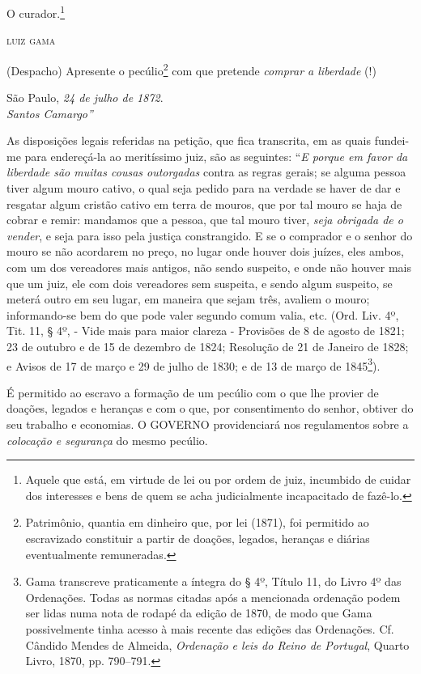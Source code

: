 {O curador.\footnote{ Aquele que está, em virtude de lei ou por ordem de
  juiz, incumbido de cuidar dos interesses e bens de quem se acha
  judicialmente incapacitado de fazê-lo.}

\textsc{luiz gama}

(Despacho) Apresente o pecúlio\footnote{ Patrimônio, quantia em
  dinheiro que, por lei (1871), foi permitido ao escravizado constituir
  a partir de doações, legados, heranças e diárias eventualmente
  remuneradas.} com que pretende \emph{comprar a liberdade} (!)

São Paulo, \emph{24 de julho de 1872}.\\
\emph{Santos Camargo''}

As disposições legais referidas na petição, que fica transcrita, em as
quais fundei-me para endereçá-la ao meritíssimo juiz, são as seguintes:
``\emph{E porque em favor da liberdade são muitas cousas outorgadas}
contra as regras gerais; se alguma pessoa tiver algum mouro cativo, o
qual seja pedido para na verdade se haver de dar e resgatar algum
cristão cativo em terra de mouros, que por tal mouro se haja de cobrar e
remir: mandamos que a pessoa, que tal mouro tiver, \emph{seja obrigada
de o vender}, e seja para isso pela justiça constrangido. E se o
comprador e o senhor do mouro se não acordarem no preço, no lugar onde
houver dois juízes, eles ambos, com um dos vereadores mais antigos, não
sendo suspeito, e onde não houver mais que um juiz, ele com dois
vereadores sem suspeita, e sendo algum suspeito, se meterá outro em seu
lugar, em maneira que sejam três, avaliem o mouro; informando-se bem do
que pode valer segundo comum valia, etc. (Ord. Liv. 4º, Tit. 11, § 4º, -
Vide mais para maior clareza - Provisões de 8 de agosto de 1821; 23 de
outubro e de 15 de dezembro de 1824; Resolução de 21 de Janeiro de 1828;
e Avisos de 17 de março e 29 de julho de 1830; e de 13 de março de
1845\footnote{ Gama transcreve praticamente a íntegra do § 4º, Título
  11, do Livro 4º das Ordenações. Todas as normas citadas após a
  mencionada ordenação podem ser lidas numa nota de rodapé da edição de
  1870, de modo que Gama possivelmente tinha acesso à mais recente das
  edições das Ordenações. Cf. Cândido Mendes de Almeida, \emph{Ordenação
  e leis do Reino de Portugal}, Quarto Livro, 1870, pp. 790--791.}).

É permitido ao escravo a formação de um pecúlio com o que lhe provier de
doações, legados e heranças e com o que, por consentimento do senhor,
obtiver do seu trabalho e economias. O GOVERNO providenciará nos
regulamentos sobre a \emph{colocação e segurança} do mesmo pecúlio.

}
